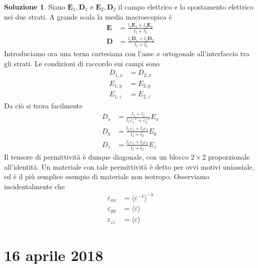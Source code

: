 \documentclass[a4paper,11pt]{book}
\renewcommand{\vec}[1]{\mathbf{#1}}
\theoremstyle{theorem}
\theoremstyle{definition}
\newtheorem{soluzione}{Soluzione}[section]
\begin{document}
\begin{soluzione}
	Siano $\vec{E}_1,\vec{D}_1$ e $\vec{E}_2,\vec{D}_2$ il campo elettrico e lo spostamento elettrico nei due strati. A grande scala la media macroscopica è
	\begin{align*}
	\vec{E}&=\frac{l_1\vec{E}_1+l_2\vec{E}_2}{l_1+l_2}\\
	\vec{D}&=\frac{l_1\vec{D}_1+l_2\vec{D}_2}{l_1+l_2}
	\end{align*}
	Introduciamo ora una terna cartesiana con l'asse $x$ ortogonale all'interfaccia tra gli strati. Le condizioni di raccordo sui campi sono
	\begin{align*}D_{1,x}&=D_{2,x}\\
	E_{1,y}&=E_{2,y}\\
	E_{1,z}&=E_{2,z}\end{align*}
	Da ciò si trova facilmente
	\begin{align*}
	D_x&=\frac{l_1+l_2}{l_1\varepsilon_1^{-1}+\varepsilon_2^{-1}}E_x\\
	D_y&=\frac{l_1\varepsilon_1+l_2\varepsilon_2}{l_1+l_2}E_y\\
	D_z&=\frac{l_1\varepsilon_1+l_2\varepsilon_2}{l_1+l_2}E_z
	\end{align*}
	Il tensore di permittività è dunque diagonale, con un blocco $2\times 2$ proporzionale all'identità. Un materiale con tale permittività è detto per ovvi motivi uniassiale, ed è il più semplice esempio di materiale non isotropo. Osserviamo incidentalmente che
	\begin{align*}
	\varepsilon_{xx}&=\langle\varepsilon^{-1}\rangle^{-1}\\
	\varepsilon_{yy}&=\langle\varepsilon\rangle\\
	\varepsilon_{zz}&=\langle\varepsilon\rangle
	\end{align*}
\end{soluzione}
\newpage
\section{16 aprile 2018}
\end{document}
